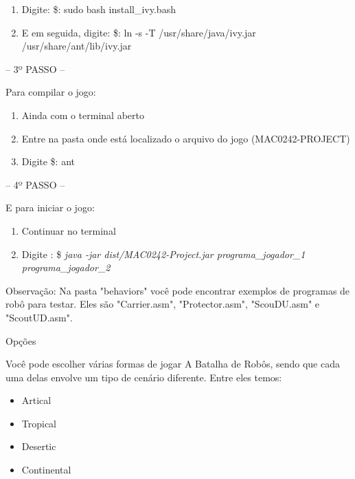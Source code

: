 \documentclass[a4paper]{article}
\begin{document}
{{{\begin{enumerate}
	\item Digite: \$: sudo bash install\_ivy.bash

	\item E em seguida, digite: \$: ln -s -T /usr/share/java/ivy.jar /usr/share/ant/lib/ivy.jar

\end{enumerate}

\bigskip


\textcolor{NavyBlue}{-- 3º PASSO --}

Para compilar o jogo:

\begin{enumerate}
	\item Ainda com o terminal aberto

	\item Entre na pasta onde está localizado o arquivo do jogo (MAC0242-PROJECT)

	\item Digite \$: ant
\end{enumerate}

\bigskip



\textcolor{NavyBlue}{-- 4º PASSO --}

E para iniciar o jogo: 

\begin{enumerate}                                            
	\item Continuar no terminal
 	\item Digite : \$ \textit{ java -jar dist/MAC0242-Project.jar programa\_jogador\_1 programa\_jogador\_2} 
\end{enumerate}

Observação: Na pasta "behaviors" você pode encontrar exemplos de programas de robô para testar.
Eles são "Carrier.asm", "Protector.asm", "ScouDU.asm" e "ScoutUD.asm".

\bigskip


\newpage %

{\textcolor{NavyBlue}{\LARGE Opções}

Você pode escolher várias formas de jogar A Batalha de Robôs,
sendo que cada uma delas envolve um tipo de cenário diferente.
Entre eles temos:

\begin{itemize}
	\item Artical
	\item Tropical
	\item Desertic
	\item Continental
\end{itemize}

}}}}
\end{document}
